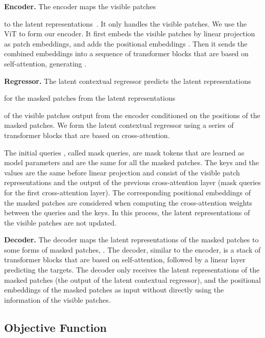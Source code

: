 \documentclass[twocolumn]{svjour3}          \smartqed  \usepackage{graphicx}
\begin{document}
\vspace{1mm}
\noindent\textbf{Encoder.}
The encoder  maps the visible patches

to the latent representations\
.
It only handles the visible patches.
We use the ViT to form our encoder.
It first embeds the visible patches 
by linear projection
as patch embeddings,
and adds the positional embeddings .
Then it sends the combined embeddings
into a sequence of transformer blocks
that are based on {self-attention}, 
generating .

\vspace{1mm}
\noindent\textbf{Regressor.}
The latent contextual regressor 
predicts the latent representations

for the masked patches
from the latent representations

of the visible patches output from the encoder
conditioned on the positions of
the masked patches.
We form the latent contextual regressor 
using a series of transformer blocks
that are based on {cross-attention}.

The initial queries ,
called mask queries,
are mask tokens
that are learned as model parameters
and are the same for all the masked patches. 
The keys and the values are the same before linear projection and
consist of 
the visible patch representations 
and the output of the previous cross-attention layer
(mask queries for the first cross-attention layer).
The corresponding positional embeddings
of the masked patches
are considered
when computing the cross-attention weights
between the queries and the keys.
In this process,
the latent representations  of the visible patches 
are not updated.




\vspace{1mm}
\noindent\textbf{Decoder.}
The decoder  maps the latent representations 
of the masked patches
to some forms of masked patches,
.
The decoder, similar to the encoder,
is a stack of transformer blocks
that are based on {self-attention},
followed by a linear layer predicting the targets.
The decoder only receives
the latent representations
of the masked patches
(the output of the latent contextual regressor),
and the positional embeddings of the masked patches
as input
without directly using the information of
the visible patches.
 



\subsection{Objective Function}
\end{document}
